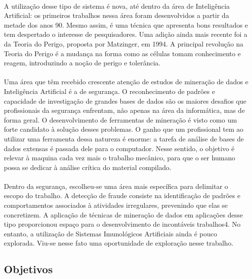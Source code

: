 \documentclass{iiufrgs}
\begin{document}
\paragraph{}A utilização desse tipo de sistema é nova, até dentro da área de Inteligência Artificial: os primeiros trabalhos nessa área foram desenvolvidos a partir da metade dos anos 90. Mesmo assim, é uma técnica que apresenta bons resultados e tem despertado o interesse de pesquisadores. Uma adição ainda mais recente foi a da Teoria do Perigo, proposta por Matzinger, em 1994. A principal revolução na Teoria do Perigo é a mudança na forma como as células tomam conhecimento e reagem, introduzindo a noção de perigo e tolerância.

\paragraph{}Uma área que têm recebido crescente atenção de estudos de mineração de dados e Inteligência Artificial é a de segurança. O reconhecimento de padrões e capacidade de investigação de grandes bases de dados são os maiores desafios que profissionais da segurança enfrentam, não apenas na área da informática, mas de forma geral. O desenvolvimento de ferramentas de mineração é visto como um forte candidato à solução desses problemas. O ganho que um profissional tem ao utilizar uma ferramenta dessa natureza é enorme: a tarefa de análise de bases de dados extensas é passada dele para o computador. Nesse sentido, o objetivo é relevar à maquina cada vez mais o trabalho mecânico, para que o ser humano possa se dedicar à análise crítica do material compilado.

\paragraph{}Dentro da segurança, escolheu-se uma área mais específica para delimitar o escopo do trabalho. A detecção de fraude consiste na identificação de padrões e comportamentos associados à atividades irregulares, prevenindo que elas se concretizem. A aplicação de técnicas de mineração de dados em aplicações desse tipo proporcionou espaço para o desenvolvimento de incontáveis trabalhos4. No entanto, a utilização de Sistemas Imunológicos Artificiais ainda é pouco explorada. Viu-se nesse fato uma oportunidade de exploração nesse trabalho.

\subsection{Objetivos}
\end{document}
